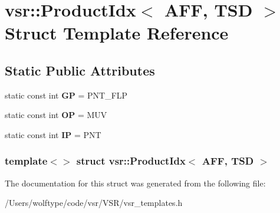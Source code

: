 \hypertarget{structvsr_1_1_product_idx_3_01_a_f_f_00_01_t_s_d_01_4}{\section{vsr\-:\-:Product\-Idx$<$ A\-F\-F, T\-S\-D $>$ Struct Template Reference}
\label{structvsr_1_1_product_idx_3_01_a_f_f_00_01_t_s_d_01_4}
}
\subsection*{Static Public Attributes}
\begin{DoxyCompactItemize}
\item 
\hypertarget{structvsr_1_1_product_idx_3_01_a_f_f_00_01_t_s_d_01_4_a1420f2c0a6f5f7c5303a5288508e737f}{static const int {\bfseries G\-P} = P\-N\-T\-\_\-\-F\-L\-P}\label{structvsr_1_1_product_idx_3_01_a_f_f_00_01_t_s_d_01_4_a1420f2c0a6f5f7c5303a5288508e737f}

\item 
\hypertarget{structvsr_1_1_product_idx_3_01_a_f_f_00_01_t_s_d_01_4_a3ae1468374ef5ec85f58654b3cc3fbc2}{static const int {\bfseries O\-P} = M\-U\-V}\label{structvsr_1_1_product_idx_3_01_a_f_f_00_01_t_s_d_01_4_a3ae1468374ef5ec85f58654b3cc3fbc2}

\item 
\hypertarget{structvsr_1_1_product_idx_3_01_a_f_f_00_01_t_s_d_01_4_a43b7fa64ca648d73fe33d63527b2e528}{static const int {\bfseries I\-P} = P\-N\-T}\label{structvsr_1_1_product_idx_3_01_a_f_f_00_01_t_s_d_01_4_a43b7fa64ca648d73fe33d63527b2e528}

\end{DoxyCompactItemize}
\subsubsection*{template$<$$>$ struct vsr\-::\-Product\-Idx$<$ A\-F\-F, T\-S\-D $>$}



The documentation for this struct was generated from the following file\-:\begin{DoxyCompactItemize}
\item 
/\-Users/wolftype/code/vsr/\-V\-S\-R/vsr\-\_\-templates.\-h\end{DoxyCompactItemize}
